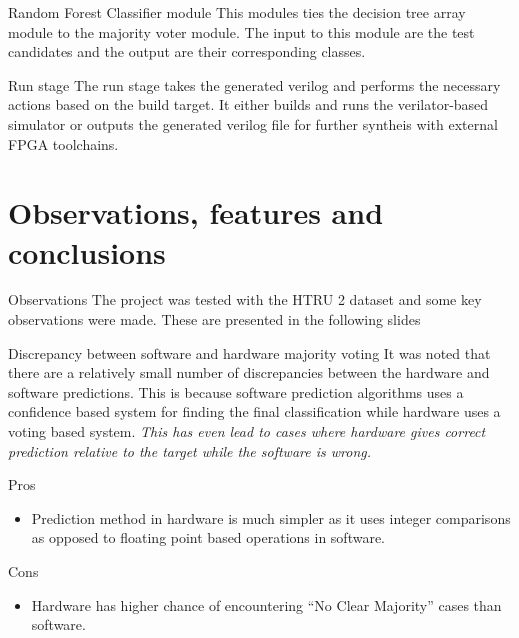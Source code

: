 \documentclass[presentation]{beamer}
\begin{document}
\begin{frame}[label={sec:org9ff3c29}]{Random Forest Classifier module}
This modules ties the decision tree array module to the majority voter module. The input to this module are the test candidates and the output are their corresponding classes.
\end{frame}

\begin{frame}[label={sec:org43efdb2}]{Run stage}
The run stage takes the generated verilog and performs the necessary actions based on the build target. It either builds and runs the verilator-based simulator or outputs the generated verilog file for further syntheis with external FPGA toolchains.
\end{frame}
\section*{Observations, features and conclusions}
\label{sec:org57aaff2}
\begin{frame}[label={sec:orga304214}]{Observations}
The project was tested with the HTRU 2 dataset and some key observations were made. These are presented in the following slides
\end{frame}
\begin{frame}[label={sec:org9d1c1fc}]{Discrepancy between software and hardware majority voting}
It was noted that there are a relatively small number of discrepancies between the hardware and software predictions. This is because software prediction algorithms uses a confidence based system for finding the final classification while hardware uses a voting based system. \emph{This has even lead to cases where hardware gives correct prediction relative to the target while the software is wrong.}

\begin{exampleblock}{Pros}
\begin{itemize}
\item Prediction method in hardware is much simpler as it uses integer comparisons as opposed to floating point based operations in software.
\end{itemize}
\end{exampleblock}

\begin{alertblock}{Cons}
\begin{itemize}
\item Hardware has higher chance of encountering ``No Clear Majority'' cases than software.
\end{itemize}
\end{alertblock}
\end{frame}
\end{document}
